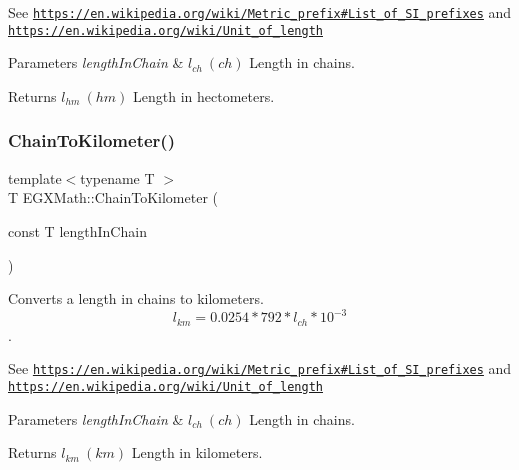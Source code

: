 See \href{https://en.wikipedia.org/wiki/Metric_prefix#List_of_SI_prefixes}{\tt https\+://en.\+wikipedia.\+org/wiki/\+Metric\+\_\+prefix\#\+List\+\_\+of\+\_\+\+S\+I\+\_\+prefixes} and \href{https://en.wikipedia.org/wiki/Unit_of_length}{\tt https\+://en.\+wikipedia.\+org/wiki/\+Unit\+\_\+of\+\_\+length} 
\begin{DoxyParams}{Parameters}
{\em length\+In\+Chain} & $ l_{ch}\ (ch)$ Length in chains. \\
\hline
\end{DoxyParams}
\begin{DoxyReturn}{Returns}
$ l_{hm}\ (hm)$ Length in hectometers. 
\end{DoxyReturn}
\mbox{\label{group___e_g_x_math-_conversions-_length_conversions-_surveyors-_chain-_s_i_ga4fd4349867e45ce387c01403b8dcf426}} 
\subsubsection{\texorpdfstring{Chain\+To\+Kilometer()}{ChainToKilometer()}}
{\footnotesize\ttfamily template$<$typename T $>$ \\
T E\+G\+X\+Math\+::\+Chain\+To\+Kilometer (\begin{DoxyParamCaption}\item[{const T}]{length\+In\+Chain }\end{DoxyParamCaption})}



Converts a length in chains to kilometers. \[ l_{km}=0.0254 * 792 * l_{ch} * 10^{-3} \]. 

See \href{https://en.wikipedia.org/wiki/Metric_prefix#List_of_SI_prefixes}{\tt https\+://en.\+wikipedia.\+org/wiki/\+Metric\+\_\+prefix\#\+List\+\_\+of\+\_\+\+S\+I\+\_\+prefixes} and \href{https://en.wikipedia.org/wiki/Unit_of_length}{\tt https\+://en.\+wikipedia.\+org/wiki/\+Unit\+\_\+of\+\_\+length} 
\begin{DoxyParams}{Parameters}
{\em length\+In\+Chain} & $ l_{ch}\ (ch)$ Length in chains. \\
\hline
\end{DoxyParams}
\begin{DoxyReturn}{Returns}
$ l_{km}\ (km)$ Length in kilometers. 
\end{DoxyReturn}
\mbox{\label{group___e_g_x_math-_conversions-_length_conversions-_surveyors-_chain-_s_i_gad564a80fe3ce7cb8c129758004256a12}} 
